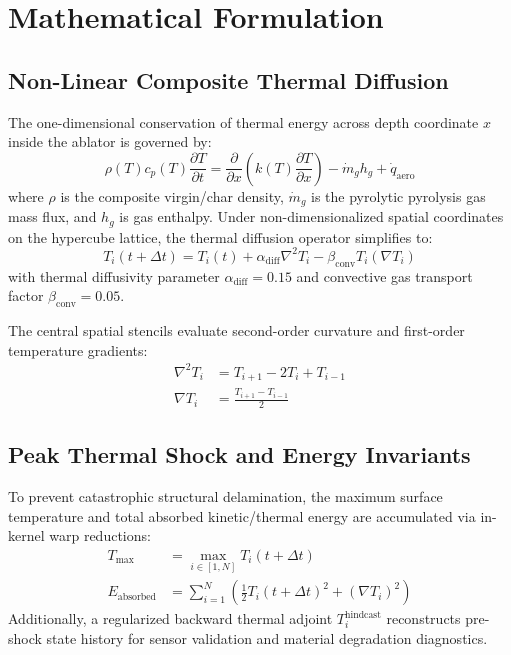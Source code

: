 \documentclass[10pt,twocolumn]{article}
\begin{document}
\section{Mathematical Formulation}

\subsection{Non-Linear Composite Thermal Diffusion}
The one-dimensional conservation of thermal energy across depth coordinate $x$ inside the ablator is governed by:
\begin{equation}
\rho(T) c_p(T) \frac{\partial T}{\partial t} = \frac{\partial}{\partial x}\left( k(T) \frac{\partial T}{\partial x} \right) - \dot{m}_g h_g + \dot{q}_{\text{aero}}
\end{equation}
where $\rho$ is the composite virgin/char density, $\dot{m}_g$ is the pyrolytic pyrolysis gas mass flux, and $h_g$ is gas enthalpy. Under non-dimensionalized spatial coordinates on the hypercube lattice, the thermal diffusion operator simplifies to:
\begin{equation}
T_i(t+\Delta t) = T_i(t) + \alpha_{\text{diff}} \nabla^2 T_i - \beta_{\text{conv}} T_i (\nabla T_i)
\end{equation}
with thermal diffusivity parameter $\alpha_{\text{diff}} = 0.15$ and convective gas transport factor $\beta_{\text{conv}} = 0.05$.

The central spatial stencils evaluate second-order curvature and first-order temperature gradients:
\begin{align}
\nabla^2 T_i &= T_{i+1} - 2T_i + T_{i-1} \\
\nabla T_i &= \frac{T_{i+1} - T_{i-1}}{2}
\end{align}

\subsection{Peak Thermal Shock and Energy Invariants}
To prevent catastrophic structural delamination, the maximum surface temperature and total absorbed kinetic/thermal energy are accumulated via in-kernel warp reductions:
\begin{align}
T_{\text{max}} &= \max_{i \in [1, N]} T_i(t+\Delta t) \\
E_{\text{absorbed}} &= \sum_{i=1}^N \left( \frac{1}{2} T_i(t+\Delta t)^2 + (\nabla T_i)^2 \right)
\end{align}
Additionally, a regularized backward thermal adjoint $T_i^{\text{hindcast}}$ reconstructs pre-shock state history for sensor validation and material degradation diagnostics.
\end{document}
